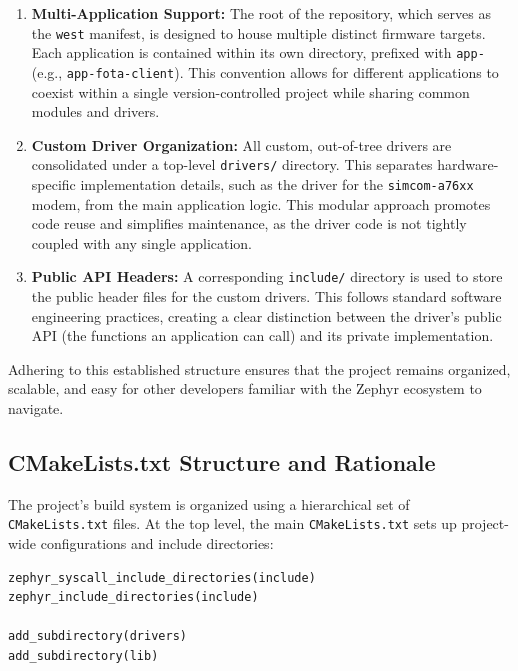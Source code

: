 \begin{enumerate}
    \item \textbf{Multi-Application Support:} The root of the repository, which serves as the \texttt{west} manifest, is designed to house multiple distinct firmware targets. Each application is contained within its own directory, prefixed with \texttt{app-} (e.g., \texttt{app-fota-client}). This convention allows for different applications to coexist within a single version-controlled project while sharing common modules and drivers.

    \item \textbf{Custom Driver Organization:} All custom, out-of-tree drivers are consolidated under a top-level \texttt{drivers/} directory. This separates hardware-specific implementation details, such as the driver for the \texttt{simcom-a76xx} modem, from the main application logic. This modular approach promotes code reuse and simplifies maintenance, as the driver code is not tightly coupled with any single application.

    \item \textbf{Public API Headers:} A corresponding \texttt{include/} directory is used to store the public header files for the custom drivers. This follows standard software engineering practices, creating a clear distinction between the driver's public API (the functions an application can call) and its private implementation.
\end{enumerate}

Adhering to this established structure ensures that the project remains organized, scalable, and easy for other developers familiar with the Zephyr ecosystem to navigate.

\subsection{CMakeLists.txt Structure and Rationale}

The project's build system is organized using a hierarchical set of \texttt{CMakeLists.txt} files. At the top level, the main \texttt{CMakeLists.txt} sets up project-wide configurations and include directories:

\begin{verbatim}
zephyr_syscall_include_directories(include)
zephyr_include_directories(include)

add_subdirectory(drivers)
add_subdirectory(lib)
\end{verbatim}

